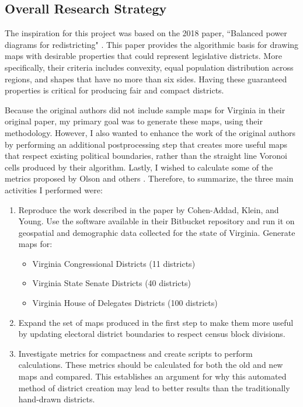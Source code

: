 \documentclass[11pt]{article}
\begin{document}
\subsection{Overall Research Strategy}

The inspiration for this project was based on the 2018 paper, ``Balanced power diagrams for redistricting" \cite{cohenaddad2017balanced}. This paper provides the algorithmic basis for drawing maps with desirable properties that could represent legislative districts. More specifically, their criteria includes convexity, equal population distribution across regions, and shapes that have no more than six sides. Having these guaranteed properties is critical for producing fair and compact districts.   

\medskip

Because the original authors did not include sample maps for Virginia in their original paper, my primary goal was to generate these maps, using their methodology. However, I also wanted to enhance the work of the original authors by performing an additional postprocessing step that creates more useful maps that respect existing political boundaries, rather than the straight line Voronoi cells produced by their algorithm. Lastly, I wished to calculate some of the metrics proposed by Olson \cite{BrianOlsonMetrics} and others \cite{OtherMetrics}. Therefore, to summarize, the three main activities I performed were:
\begin{enumerate}
	\item Reproduce the work described in the paper by Cohen-Addad, Klein, and Young. Use the software available in their Bitbucket repository and run it on geospatial and demographic data collected for the state of Virginia. Generate maps for:
		\begin{itemize}
			\item Virginia Congressional Districts (11 districts)
			\item Virginia State Senate Districts (40 districts)
			\item Virginia House of Delegates Districts (100 districts)
		\end{itemize}
	\item Expand the set of maps produced in the first step to make them more useful by updating electoral district boundaries to respect census block divisions. 
	\item Investigate metrics for compactness and create scripts to perform calculations. These metrics should be calculated for both the old and new maps and compared. This establishes an argument for why this automated method of district creation may lead to better results than the traditionally hand-drawn districts. 
\end{enumerate}
\end{document}
